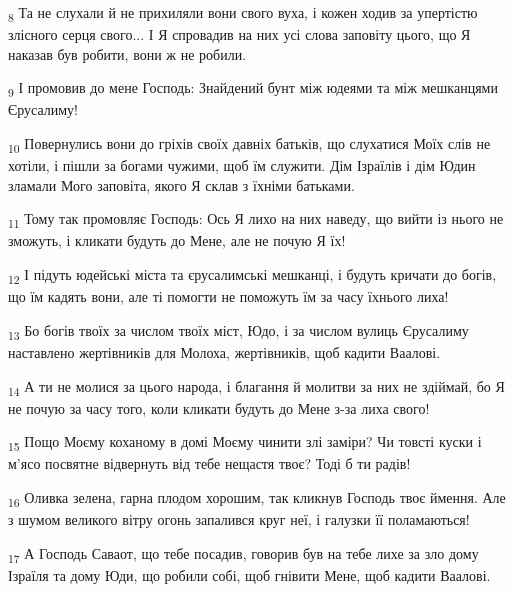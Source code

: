 \begin{tcolorbox}
\textsubscript{8} Та не слухали й не прихиляли вони свого вуха, і кожен ходив за упертістю злісного серця свого... І Я спровадив на них усі слова заповіту цього, що Я наказав був робити, вони ж не робили.
\end{tcolorbox}
\begin{tcolorbox}
\textsubscript{9} І промовив до мене Господь: Знайдений бунт між юдеями та між мешканцями Єрусалиму!
\end{tcolorbox}
\begin{tcolorbox}
\textsubscript{10} Повернулись вони до гріхів своїх давніх батьків, що слухатися Моїх слів не хотіли, і пішли за богами чужими, щоб їм служити. Дім Ізраїлів і дім Юдин зламали Мого заповіта, якого Я склав з їхніми батьками.
\end{tcolorbox}
\begin{tcolorbox}
\textsubscript{11} Тому так промовляє Господь: Ось Я лихо на них наведу, що вийти із нього не зможуть, і кликати будуть до Мене, але не почую Я їх!
\end{tcolorbox}
\begin{tcolorbox}
\textsubscript{12} І підуть юдейські міста та єрусалимські мешканці, і будуть кричати до богів, що їм кадять вони, але ті помогти не поможуть їм за часу їхнього лиха!
\end{tcolorbox}
\begin{tcolorbox}
\textsubscript{13} Бо богів твоїх за числом твоїх міст, Юдо, і за числом вулиць Єрусалиму наставлено жертівників для Молоха, жертівників, щоб кадити Ваалові.
\end{tcolorbox}
\begin{tcolorbox}
\textsubscript{14} А ти не молися за цього народа, і благання й молитви за них не здіймай, бо Я не почую за часу того, коли кликати будуть до Мене з-за лиха свого!
\end{tcolorbox}
\begin{tcolorbox}
\textsubscript{15} Пощо Моєму коханому в домі Моєму чинити злі заміри? Чи товсті куски і м'ясо посвятне відвернуть від тебе нещастя твоє? Тоді б ти радів!
\end{tcolorbox}
\begin{tcolorbox}
\textsubscript{16} Оливка зелена, гарна плодом хорошим, так кликнув Господь твоє ймення. Але з шумом великого вітру огонь запалився круг неї, і галузки її поламаються!
\end{tcolorbox}
\begin{tcolorbox}
\textsubscript{17} А Господь Саваот, що тебе посадив, говорив був на тебе лихе за зло дому Ізраїля та дому Юди, що робили собі, щоб гнівити Мене, щоб кадити Ваалові.
\end{tcolorbox}
